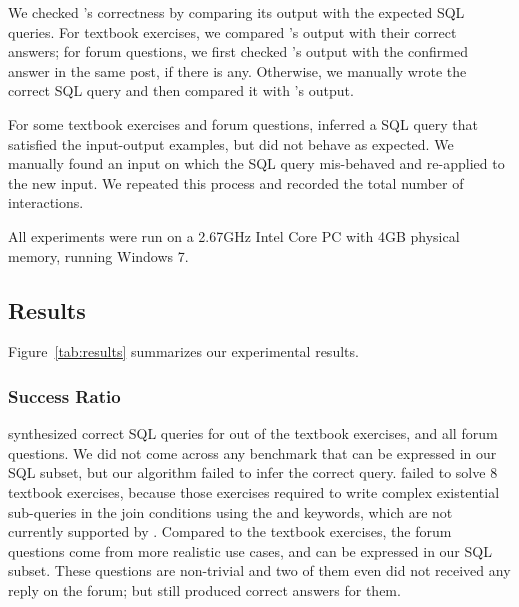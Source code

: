 We checked \ourtool's correctness by comparing its
output with the expected SQL queries.
For textbook exercises, we compared \ourtool's output with
their correct answers; for forum questions, we first
checked \ourtool's output with the confirmed answer
in the same post, if there is any. Otherwise, we
manually wrote the correct SQL query and then
compared it with \ourtool's output.

For some textbook exercises and forum questions,
\ourtool inferred a SQL query that satisfied the input-output
examples, but did not behave as expected.
We manually found an input on which the
SQL query mis-behaved and re-applied \ourtool to the new input. We
repeated this process and recorded the total number of
interactions.


All experiments were run on a 2.67GHz Intel Core PC
with 4GB physical memory, running Windows 7.






\vspace{-2mm}
\subsection{Results}
\vspace{-1mm}

Figure~\ref{tab:results} summarizes our experimental results.

\subsubsection{Success Ratio}
\label{sec:ratio}


\ourtool synthesized correct SQL queries for \solexnum  out of
\exnum the textbook exercises, and 
all \pnum forum questions.
We did not come across any benchmark
that can be expressed in our SQL subset,
but our algorithm failed to infer the correct query.
\ourtool failed to solve 8 textbook exercises,
because those exercises required to write
complex existential sub-queries in the join conditions
using the  and  keywords,
which are not currently supported by \ourtool.
Compared to the textbook exercises, the \pnum
forum questions come from more realistic use cases,
and can be expressed in our SQL subset.
These questions are non-trivial and
two of them even did not received any reply on the forum;
but \ourtool still produced correct answers for them.



